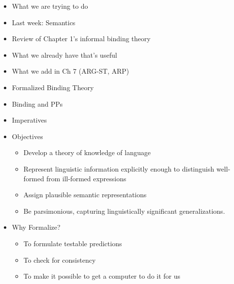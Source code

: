 \documentclass[a4paper,landscape,headrule,footrule]{foils}
\begin{document}
\avmfont{\it}

\maketitle


\begin{itemize}
\item What we are trying to do
\item Last week: Semantics
\item Review of Chapter 1's informal binding theory
\item What we already have that’s useful
\item What we add in Ch 7 (ARG-ST, ARP)
\item Formalized Binding Theory
\item Binding and PPs
\item Imperatives
\end{itemize}



\begin{itemize}
\item Objectives
\begin{itemize}
\item Develop a theory of knowledge of language
\item Represent linguistic information explicitly enough to
distinguish well-formed from ill-formed expressions
\item Assign plausible semantic representations
\item Be parsimonious, capturing linguistically significant
generalizations.
\end{itemize}
\item Why Formalize?
\begin{itemize}
\item To formulate testable predictions
\item To check for consistency
\item To make it possible to get a computer to do it for us
\end{itemize}
\end{itemize}
\end{document}
